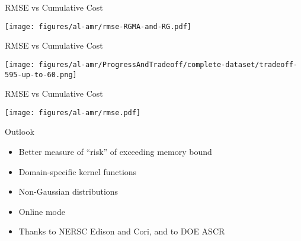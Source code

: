 \documentclass{beamer}
\begin{document}
\begin{frame}{RMSE vs Cumulative Cost}
  \begin{center}
     \texttt{[image: figures/al-amr/rmse-RGMA-and-RG.pdf]}
  \end{center}
\end{frame}
    
\begin{frame}{RMSE vs Cumulative Cost}
  \begin{center}
    \texttt{[image: figures/al-amr/ProgressAndTradeoff/complete-dataset/tradeoff-595-up-to-60.png]}
  \end{center}
\end{frame}

\begin{frame}{RMSE vs Cumulative Cost}
  \begin{center}
    \texttt{[image: figures/al-amr/rmse.pdf]}
  \end{center}
\end{frame}

\begin{frame}{Outlook}
  \begin{itemize}
  \item Better measure of ``risk'' of exceeding memory bound
  \item Domain-specific kernel functions
  \item Non-Gaussian distributions
  \item Online mode
  \item Thanks to NERSC Edison and Cori, and to DOE ASCR
  \end{itemize}
\end{frame}
\end{document}

